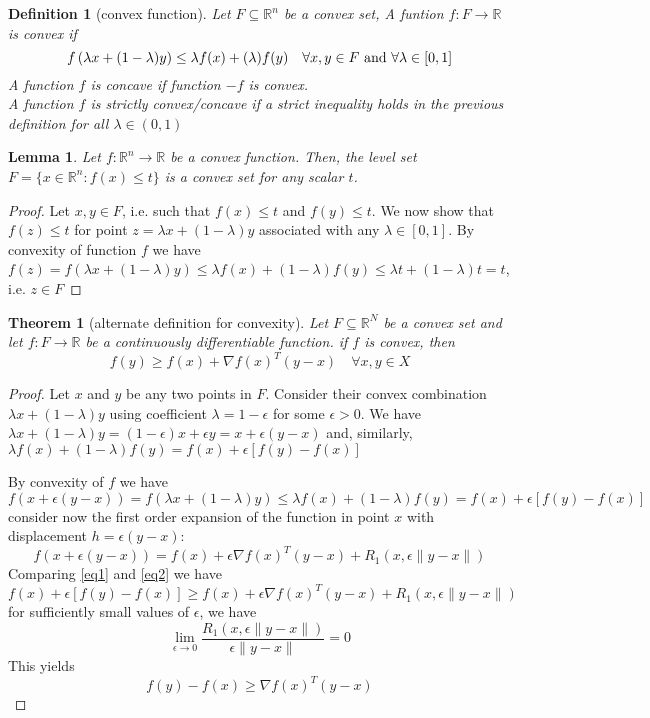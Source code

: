 \documentclass{book}
\newcommand{\R}{\mathbb{R}}
\theoremstyle{theoremv2}
\newtheorem{theorem}{Theorem}[chapter]
\newtheorem{lemma}{Lemma}[chapter]
\theoremstyle{defv2}
\newtheorem{definition}{Definition}[chapter]
\theoremstyle{remark}
\theoremstyle{remark}
\begin{document}
\begin{definition}[convex function]
    Let $F\subseteq \R^n$ be a convex set, A funtion $f:F\to\R$ is \emph{convex} if 
    \[
        f\left(\lambda x+(1-\lambda)y\right)\leq \lambda f(x) + (\-\lambda)f(y) \quad \forall x,y\in F \text{ and }\forall \lambda\in[0,1]
    \]
    A function $f$ is \emph{concave} if function $-f$ is convex.\\
    A function $f$ is \emph{strictly convex/concave} if a strict inequality holds in the previous definition for all $\lambda\in(0,1)$
\end{definition}
\begin{lemma}
    Let $f:\R^n\to\R$ be a convex function. Then, the level set $F=\{ x\in\R^n:f(x)\leq t \}$ is a convex set for any scalar $t$.
\end{lemma}
\begin{proof}
    Let $x,y\in F$, i.e. such that $f(x)\leq t$ and $f(y)\leq t$. We now show that $f(z)\leq t$ for point $z=\lambda x + (1-\lambda)y$ associated with any $\lambda\in[0,1]$. By convexity of function $f$ we have $f(z)= f\left(\lambda x + (1-\lambda)y\right)\leq \lambda f(x) + (1-\lambda)f(y)\leq\lambda t + (1-\lambda)t = t$, i.e. $z\in F$
\end{proof}
\begin{theorem}[alternate definition for convexity]
    \label{convdef}
    Let $F\subseteq \R^N$ be a convex set and let $f:F\to\R$ be a continuously differentiable function. if $f$ is convex, then 
    \[
        f(y)\geq f(x)+\nabla f(x)^T(y-x) \quad \forall x,y\in X
    \]
\end{theorem}
\begin{proof}
    Let $x$ and $y$ be any two points in $F$. Consider their convex combination $\lambda x + (1-\lambda)y$ using coefficient $\lambda=1-\epsilon$ for some $\epsilon>0$. We have $\lambda x+ (1-\lambda)y = (1-\epsilon)x + \epsilon y = x + \epsilon(y-x)$ and, similarly, $\lambda f(x)+ (1-\lambda)f(y) = f(x) + \epsilon[f(y)-f(x)]$
    
    By convexity of $f$ we have 
    \begin{equation}
        \label{eq1}
        f\left(x+\epsilon(y-x)\right) = f\left(\lambda x + (1-\lambda)y \right)\leq \lambda f(x) + (1-\lambda)f(y) = f(x) + \epsilon[f(y)-f(x)]
    \end{equation}
    consider now the first order expansion of the function in point $x$ with displacement $h=\epsilon(y-x)$:
    \begin{equation}
        \label{eq2}
        f\left(x+\epsilon(y-x)\right)  = f(x)+\epsilon\nabla f(x)^T(y-x) + R_1(x,\epsilon\|y-x\|)
    \end{equation}
    Comparing \eqref{eq1} and \eqref{eq2} we have
    \[
        f(x) + \epsilon[f(y)-f(x)]\geq f(x) + \epsilon\nabla f(x)^T(y-x)+ R_1(x,\epsilon\|y-x\|)
    \]
    for sufficiently small values of $\epsilon$, we have 
    \[
        \lim_{\epsilon\to 0} \displaystyle\frac{R_1(x,\epsilon\|y-x\|)}{\epsilon\|y-x\|}=0
    \]
    This yields 
    \[
        f(y)-f(x) \geq \nabla f(x)^T(y-x)
    \]
\end{proof}
\end{document}
